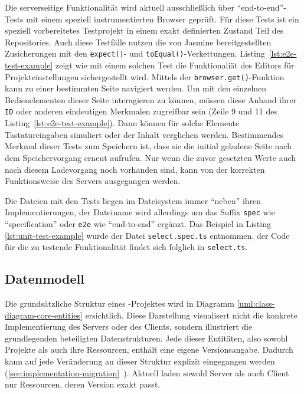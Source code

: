 

Die serverseitige Funktionalität wird aktuell ausschließlich über "`end-to-end"'-Tests mit einem speziell instrumentierten Browser geprüft. Für diese Tests ist ein speziell vorbereitetes Testprojekt in einem exakt definierten Zustand Teil des Repositories. Auch diese Testfälle nutzen die von Jasmine bereitgestellten Zusicherungen mit den \texttt{expect()}- und \texttt{toEqual()}-Verkettungen. Listing~\ref{lst:e2e-test-example} zeigt wie mit einem solchen Test die Funktionaliät des Editors für Projekteinstellungen sichergestellt wird. Mittels der \texttt{browser.get()}-Funktion kann zu einer bestimmten Seite navigiert werden. Um mit den einzelnen Bedienelementen dieser Seite interagieren zu können, müssen diese Anhand ihrer \texttt{ID} oder anderen eindeutigen Merkmalen zugreifbar sein (Zeile 9 und 11 des Listing~\ref{lst:e2e-test-example}). Dann können für solche Elemente Tastatureingaben simuliert oder der Inhalt verglichen werden. Bestimmendes Merkmal dieser Tests zum Speichern ist, dass sie die initial geladene Seite nach dem Speichervorgang erneut aufrufen. Nur wenn die zuvor gesetzten Werte auch nach diesem Ladevorgang noch vorhanden sind, kann von der korrekten Funktionsweise des Servers ausgegangen werden.



Die Dateien mit den Tests liegen im Dateisystem immer "`neben"' ihren Implementierungen, der Dateiname wird allerdings um das Suffix \texttt{spec} wie "`specification"' oder \texttt{e2e} wie "`end-to-end"' ergänzt. Das Beispiel in Listing  \ref{lst:unit-test-example} wurde der Datei \texttt{select.spec.ts} entnommen, der Code für die zu testende Funktionalität findet sich folglich in \texttt{select.ts}.

\subsection{Datenmodell}

Die grundsätzliche Struktur eines \idename-Projektes wird in Diagramm \ref{uml:class-diagram-core-entities} ersichtlich. Diese Darstellung visualisert nicht die konkrete Implementierung des Servers oder des Clients, sondern illustriert die grundlegenden beteiligten Datenstrukturen. Jede dieser Entitäten, also sowohl Projekte als auch ihre Ressourcen, enthält eine eigene Versionsangabe. Dadurch kann auf jede Veränderung an dieser Struktur explizit eingegangen werden (\ref{sec:implementation-migration}~). Aktuell laden sowohl Server als auch Client nur Ressourcen, deren Version exakt passt.

